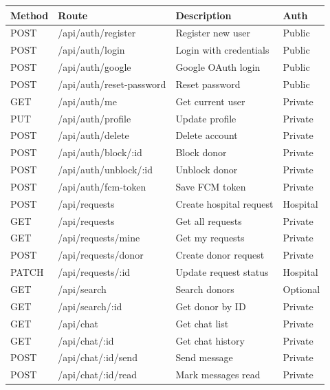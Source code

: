 \documentclass[12pt,a4paper]{article}
\begin{document}
\begin{table}[H]
\centering
\renewcommand{\arraystretch}{1.2}
\scriptsize
\begin{tabularx}{\textwidth}{|l|l|X|l|}
    \hline
    \textbf{Method} & \textbf{Route} & \textbf{Description} & \textbf{Auth} \\
    \hline
    POST & /api/auth/register & Register new user & Public \\
    \hline
    POST & /api/auth/login & Login with credentials & Public \\
    \hline
    POST & /api/auth/google & Google OAuth login & Public \\
    \hline
    POST & /api/auth/reset-password & Reset password & Public \\
    \hline
    GET & /api/auth/me & Get current user & Private \\
    \hline
    PUT & /api/auth/profile & Update profile & Private \\
    \hline
    POST & /api/auth/delete & Delete account & Private \\
    \hline
    POST & /api/auth/block/:id & Block donor & Private \\
    \hline
    POST & /api/auth/unblock/:id & Unblock donor & Private \\
    \hline
    POST & /api/auth/fcm-token & Save FCM token & Private \\
    \hline
    POST & /api/requests & Create hospital request & Hospital \\
    \hline
    GET & /api/requests & Get all requests & Private \\
    \hline
    GET & /api/requests/mine & Get my requests & Private \\
    \hline
    POST & /api/requests/donor & Create donor request & Private \\
    \hline
    PATCH & /api/requests/:id & Update request status & Hospital \\
    \hline
    GET & /api/search & Search donors & Optional \\
    \hline
    GET & /api/search/:id & Get donor by ID & Private \\
    \hline
    GET & /api/chat & Get chat list & Private \\
    \hline
    GET & /api/chat/:id & Get chat history & Private \\
    \hline
    POST & /api/chat/:id/send & Send message & Private \\
    \hline
    POST & /api/chat/:id/read & Mark messages read & Private \\

\end{tabularx}
\end{table}
\end{document}
